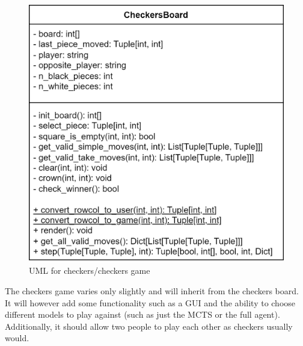 \documentclass{article}
\begin{document}
    \begin{figure}[h]
        \centering
        \includegraphics[scale = 0.24]{DraughtsUMLdrawio.png}
        \caption{UML for checkers/checkers game}
    \end{figure}

    The checkers game varies only slightly and will inherit from the checkers board. It will however add some functionality such as a GUI and the ability to choose different
    models to play against (such as just the MCTS or the full agent). Additionally, it should allow two people to play each other as checkers usually would.
\end{document}
